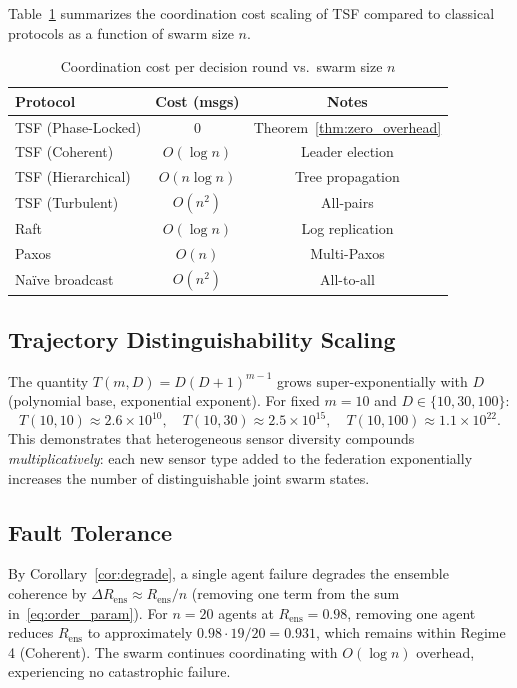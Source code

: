 \documentclass[twocolumn,10pt]{article}
\newcommand{\Rens}{R_{\mathrm{ens}}}
\begin{document}
Table~\ref{tab:cost} summarizes the coordination cost scaling of TSF compared
to classical protocols as a function of swarm size $n$.

\begin{table}[t]
\centering
\caption{Coordination cost per decision round vs.\ swarm size $n$}
\label{tab:cost}
\scriptsize
\begin{tabular}{@{}lcc@{}}
\toprule
\textbf{Protocol} & \textbf{Cost (msgs)} & \textbf{Notes} \\
\midrule
TSF (Phase-Locked)      & $0$            & Theorem~\ref{thm:zero_overhead} \\
TSF (Coherent)          & $O(\log n)$    & Leader election \\
TSF (Hierarchical)      & $O(n \log n)$  & Tree propagation \\
TSF (Turbulent)         & $O(n^2)$       & All-pairs \\
Raft~\cite{Ongaro2014}  & $O(\log n)$    & Log replication \\
Paxos~\cite{Lamport1998}& $O(n)$         & Multi-Paxos \\
Na{\"i}ve broadcast     & $O(n^2)$       & All-to-all \\
\bottomrule
\end{tabular}
\end{table}

\subsection{Trajectory Distinguishability Scaling}

The quantity $T(m,D) = D(D+1)^{m-1}$ grows super-exponentially with $D$
(polynomial base, exponential exponent). For fixed $m = 10$ and
$D \in \{10, 30, 100\}$:
\[
  T(10, 10) \approx 2.6 \times 10^{10}, \quad
  T(10, 30) \approx 2.5 \times 10^{15}, \quad
  T(10,100) \approx 1.1 \times 10^{22}.
\]
This demonstrates that heterogeneous sensor diversity compounds
\emph{multiplicatively}: each new sensor type added to the federation
exponentially increases the number of distinguishable joint swarm states.

\subsection{Fault Tolerance}

By Corollary~\ref{cor:degrade}, a single agent failure degrades the ensemble
coherence by $\Delta\Rens \approx \Rens/n$ (removing one term from the sum
in~\eqref{eq:order_param}). For $n = 20$ agents at $\Rens = 0.98$, removing
one agent reduces $\Rens$ to approximately $0.98 \cdot 19/20 = 0.931$,
which remains within Regime 4 (Coherent). The swarm continues coordinating
with $O(\log n)$ overhead, experiencing no catastrophic failure.
\end{document}
